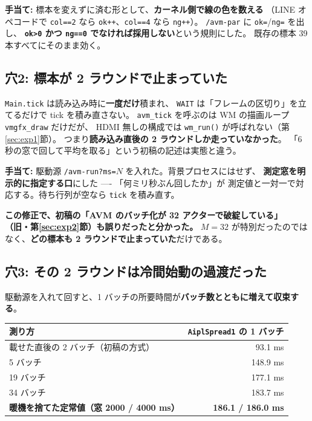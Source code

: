 \documentclass[a4paper,11pt]{ltjsarticle}
\begin{document}
\textbf{手当て:} 標本を変えずに済む形として、\textbf{カーネル側で線の色を数える}
（LINE オペコードで \texttt{col==2} なら \texttt{ok++}、\texttt{col==4} なら \texttt{ng++}）。
\texttt{/avm-par} に \texttt{ok=}/\texttt{ng=} を出し、
\textbf{\texttt{ok>0} かつ \texttt{ng==0} でなければ採用しない}という規則にした。
既存の標本 39 本すべてにそのまま効く。

\subsection{穴2: 標本が 2 ラウンドで止まっていた}
\texttt{Main.tick} は読み込み時に\textbf{一度だけ}積まれ、
\texttt{WAIT} は「フレームの区切り」を立てるだけで tick を積み直さない。
\texttt{avm\_tick} を呼ぶのは WM の描画ループ \texttt{vmgfx\_draw} だけだが、
HDMI 無しの構成では \texttt{wm\_run()} が呼ばれない（第\ref{sec:exp1}節）。
つまり\textbf{読み込み直後の 2 ラウンドしか走っていなかった}。
「6 秒の窓で回して平均を取る」という初稿の記述は実態と違う。

\textbf{手当て:} 駆動源 \texttt{/avm-run?ms=$N$} を入れた。背景プロセスにはせず、
\textbf{測定窓を明示的に指定する口}にした ---- 「何ミリ秒ぶん回したか」が
測定値と一対一で対応する。待ち行列が空なら \texttt{tick} を積み直す。

\textbf{この修正で、初稿の「AVM のバッチ化が 32 アクターで破綻している」
（旧・第\ref{sec:exp2}節）も誤りだったと分かった。}
$M=32$ が特別だったのではなく、\textbf{どの標本も 2 ラウンドで止まっていた}だけである。

\subsection{穴3: その 2 ラウンドは冷間始動の過渡だった}
駆動源を入れて回すと、1 バッチの所要時間が\textbf{バッチ数とともに増えて収束する}。

\begin{center}
\begin{tabular}{lr}
\toprule
測り方 & \texttt{AiplSpread1} の 1 バッチ \\
\midrule
載せた直後の 2 バッチ（初稿の方式） & 93.1 ms \\
5 バッチ & 148.9 ms \\
19 バッチ & 177.1 ms \\
34 バッチ & 183.7 ms \\
\textbf{暖機を捨てた定常値（窓 2000 / 4000 ms）} & \textbf{186.1 / 186.0 ms} \\
\bottomrule
\end{tabular}
\end{center}
\end{document}
